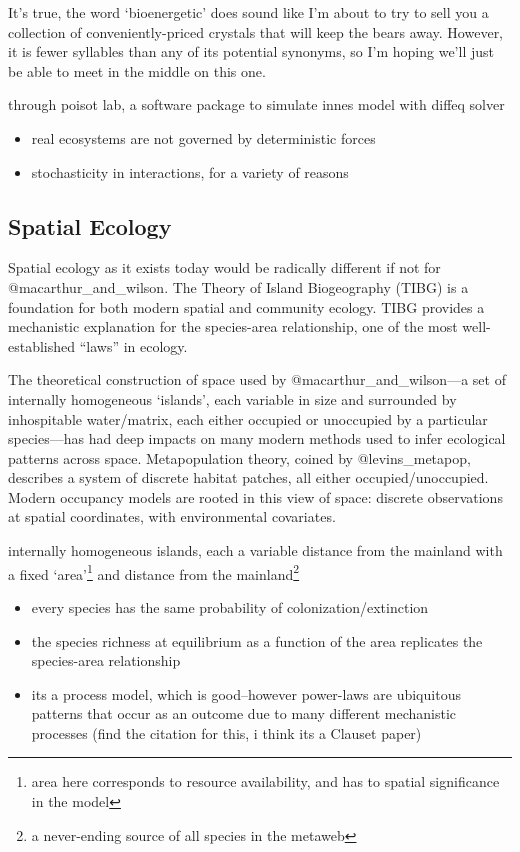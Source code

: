 It's true, the word `bioenergetic' does sound like I'm about to try to
sell you a collection of conveniently-priced crystals that will keep the
bears away. However, it is fewer syllables than any of its potential
synonyms, so I'm hoping we'll just be able to meet in the middle on this
one.

through poisot lab, a software package to simulate innes model with
diffeq solver

\begin{itemize}
\tightlist
\item
  real ecosystems are not governed by deterministic forces
\item
  stochasticity in interactions, for a variety of reasons
\end{itemize}

\hypertarget{spatial-ecology}{%
\subsection{Spatial Ecology}\label{spatial-ecology}}

Spatial ecology as it exists today would be radically different if not
for @macarthur\_and\_wilson. The Theory of Island Biogeography (TIBG) is
a foundation for both modern spatial and community ecology. TIBG
provides a mechanistic explanation for the species-area relationship,
one of the most well-established ``laws'' in ecology.

The theoretical construction of space used by
@macarthur\_and\_wilson---a set of internally homogeneous `islands',
each variable in size and surrounded by inhospitable water/matrix, each
either occupied or unoccupied by a particular species---has had deep
impacts on many modern methods used to infer ecological patterns across
space. Metapopulation theory, coined by @levins\_metapop, describes a
system of discrete habitat patches, all either occupied/unoccupied.
Modern occupancy models are rooted in this view of space: discrete
observations at spatial coordinates, with environmental covariates.

internally homogeneous islands, each a variable distance from the
mainland with a fixed `area'\footnote{area here corresponds to resource
  availability, and has to spatial significance in the model} and
distance from the mainland\footnote{a never-ending source of all species
  in the metaweb}

\begin{itemize}
\tightlist
\item
  every species has the same probability of colonization/extinction
\item
  the species richness at equilibrium as a function of the area
  replicates the species-area relationship
\item
  its a process model, which is good--however power-laws are ubiquitous
  patterns that occur as an outcome due to many different mechanistic
  processes (find the citation for this, i think its a Clauset paper)
\end{itemize}

